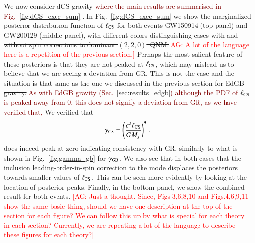 \documentclass[twocolumn,
               prd,
               aps,
               superscriptaddress,
               tightenlines,
               nofootinbib,
               eqsecnum,
               amsfonts,
               amsmath,
               longbibliography]{revtex4-1}
\newcommand{\agcomm}[1]{{\textcolor{red}{{[AG: #1]}} }}
\newcommand{\ag}[1]{{\textcolor{Maroon}{{#1}} }}
\begin{document}
We now consider dCS gravity \ag{where the main results are summarised in Fig.~\ref{fig:dCS_exec_sum}}.
%
\sout{In Fig.~\ref{fig:dCS_exec_sum} we show the marginalized posterior distribution
function of $\ell_{\rm CS}$ for both events GW150914 (top panel) and GW200129
(middle panel), with different colors distinguishing cases with and without spin corrections to
dominant $(2,2,0)$~QNM.}\agcomm{A lot of the language here is a repetition of the previous section.}
%
\sout{Perhaps the most salient feature of these posteriors is that they are not
peaked at $\ell_{\rm CS}$, which may mislead us to believe that we are seeing a
deviation from GR. This is not the case and the situation is that same as the
one we discussed in the previous section for EdGB gravity.}
\ag{As with EdGB gravity (Sec.~\ref{sec:results_edgb}) although the PDF of $\ell_{\rm CS}$
is peaked away from 0, this does not signify a deviation from GR, as we have verified that,}
%
\sout{We verified that}
%
\begin{equation}
    \gamma_{\rm CS} = \left( \frac{c^2 \ell_{\rm CS}}{G M_{f}} \right)^{4}\,,
\end{equation}
%
does indeed peak at zero indicating consistency with GR, similarly to what is shown in Fig.~\ref{fig:gamma_gb} for $\gamma_{\rm GB}$.
%
We also see that in both cases that the inclusion leading-order-in-spin
correction to the mode displaces the posteriors towards smaller values of
$\ell_{\rm CS}$. This can be seen more evidently by looking at the location of
posterior peaks.
%
Finally, in the bottom panel, we show the combined result for both events.
\agcomm{Just a thought.  Since, Figs 3,6,8,10 and Figs.4,6,9,11 show the same basic thing,
should we have one description at the top of the section for each figure? We can follow this up
by what is special for each theory in each section? Currently, we are repeating a lot of the
language to describe these figures for each theory?}
\end{document}
